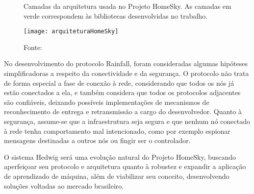 \begin{figure}[H]
	\centering
	\caption{Camadas da arquitetura usada no Projeto HomeSky. As camadas em verde correspondem às bibliotecas desenvolvidas no trabalho.}
  \texttt{[image: arquiteturaHomeSky]}
	\caption*{Fonte: \cite{homeSky}}
\label{fig:arquiteturaHomeSky}
\end{figure}

No desenvolvimento do protocolo Rainfall, foram consideradas algumas hipóteses simplificadoras a respeito da conectividade e da segurança. O protocolo não trata de forma especial a fase de conexão à rede, considerando que todos os nós já estão conectados a ela, e também considera que todos os protocolos adjacentes são confiáveis, deixando possíveis implementações de mecanismos de reconhecimento de entrega e retransmissão a cargo do desenvolvedor. Quanto à segurança, assume-se que a infraestrutura seja segura e que nenhum nó conectado à rede tenha comportamento mal intencionado, como por exemplo espionar mensagens destinadas a outros nós ou fingir ser o controlador.

O sistema Hedwig será uma evolução natural do Projeto HomeSky, buscando aperfeiçoar seu protocolo e arquitetura quanto à robustez e expandir a aplicação de aprendizado de máquina, além de viabilizar seu conceito, desenvolvendo soluções voltadas ao mercado brasileiro.
